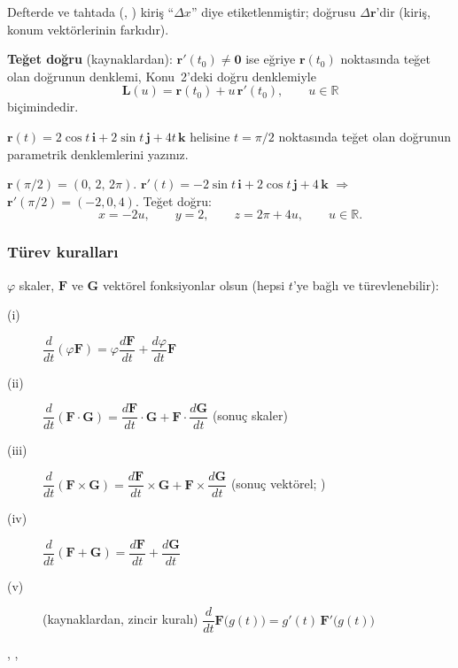 \begin{bilgi}
Defterde ve tahtada (, ) kiriş ``$\Delta x$'' diye etiketlenmiştir;
doğrusu $\Delta\mathbf r$'dir (kiriş, konum vektörlerinin farkıdır).
\end{bilgi}

\textbf{Teğet doğru} (kaynaklardan): $\mathbf r'(t_0)\neq\mathbf 0$ ise eğriye $\mathbf r(t_0)$ noktasında teğet olan doğrunun
denklemi, Konu~2'deki doğru denklemiyle
\[ \mathbf L(u)=\mathbf r(t_0)+u\,\mathbf r'(t_0),\qquad u\in\mathbb R \]
biçimindedir.

\begin{soru}
$\mathbf r(t)=2\cos t\,\mathbf i+2\sin t\,\mathbf j+4t\,\mathbf k$ helisine $t=\pi/2$ noktasında teğet olan doğrunun
parametrik denklemlerini yazınız.
\end{soru}
\begin{cevap}
$\mathbf r(\pi/2)=(0,\,2,\,2\pi)$. $\mathbf r'(t)=-2\sin t\,\mathbf i+2\cos t\,\mathbf j+4\,\mathbf k$ $\Rightarrow$
$\mathbf r'(\pi/2)=(-2,0,4)$. Teğet doğru:
\[ x=-2u,\qquad y=2,\qquad z=2\pi+4u,\qquad u\in\mathbb R . \]
\end{cevap}

\subsubsection{Türev kuralları}

\begin{teorem}
$\varphi$ skaler, $\mathbf F$ ve $\mathbf G$ vektörel fonksiyonlar olsun (hepsi $t$'ye bağlı ve türevlenebilir):
\begin{description}
\item[(i)] $\dfrac{d}{dt}(\varphi\mathbf F)=\varphi\dfrac{d\mathbf F}{dt}+\dfrac{d\varphi}{dt}\mathbf F$
\item[(ii)] $\dfrac{d}{dt}(\mathbf F\cdot\mathbf G)=\dfrac{d\mathbf F}{dt}\cdot\mathbf G+\mathbf F\cdot\dfrac{d\mathbf G}{dt}$ \quad (sonuç skaler)
\item[(iii)] $\dfrac{d}{dt}(\mathbf F\times\mathbf G)=\dfrac{d\mathbf F}{dt}\times\mathbf G+\mathbf F\times\dfrac{d\mathbf G}{dt}$ \quad (sonuç vektörel; )
\item[(iv)] $\dfrac{d}{dt}(\mathbf F+\mathbf G)=\dfrac{d\mathbf F}{dt}+\dfrac{d\mathbf G}{dt}$
\item[(v)] (kaynaklardan, zincir kuralı) $\dfrac{d}{dt}\mathbf F\big(g(t)\big)=g'(t)\,\mathbf F'\big(g(t)\big)$
\end{description}
, , 
\end{teorem}

